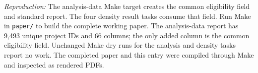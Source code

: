 \smallskip
\noindent\textit{Reproduction:} The analysis-data Make target creates the common
eligibility field and standard report. The four density result tasks consume
that field. Run Make in \texttt{paper/} to build the complete working paper.
The analysis-data report has 9,493 unique project IDs and 66 columns; the only
added column is the common eligibility field. Unchanged Make dry runs for the
analysis and density tasks report no work. The completed paper and this entry
were compiled through Make and inspected as rendered PDFs.
